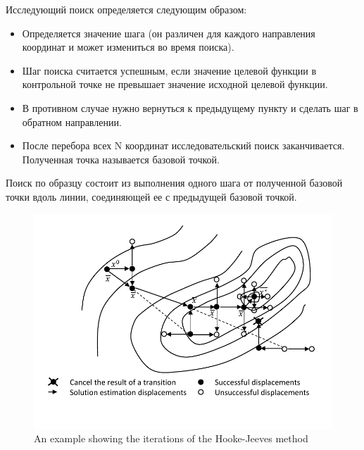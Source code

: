 \documentclass[runningheads]{llncs}
\begin{document}

Исследующий поиск определяется следующим образом: 
\begin{itemize}[label=$\bullet$] 
	\item Определяется значение шага (он различен для каждого направления координат и может измениться во время поиска). 
	\item Шаг поиска считается успешным, если значение целевой функции в контрольной точке не превышает значение исходной целевой функции. 
	\item В противном случае нужно вернуться к предыдущему пункту и сделать шаг в обратном направлении. 
	\item После перебора всех N координат исследовательский поиск заканчивается. Полученная точка называется базовой точкой.
\end{itemize}
Поиск по образцу состоит из выполнения одного шага от полученной базовой точки вдоль линии, соединяющей ее с предыдущей базовой точкой.



\begin{figure} 
	\begin{center} 
		\begin{minipage}[h]{1.0\linewidth} 
			\includegraphics[width=1\linewidth]{figure/fig1.pdf} 
			\caption{An example showing the iterations of the Hooke-Jeeves method} %
			\label{fig:fig1} 
		\end{minipage} 
	\end{center} 
\end{figure}	
\end{document}
